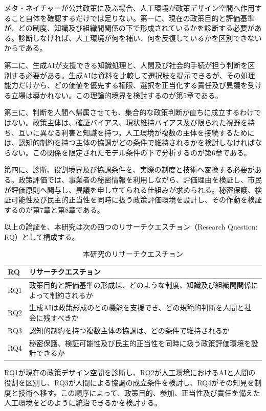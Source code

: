 メタ・ネイチャーが公共政策に及ぶ場合、人工環境が政策デザイン空間へ作用すること自体を確認するだけでは足りない。第一に、現在の政策目的と評価基準が、どの制度、知識及び組織間関係の下で形成されているかを診断する必要がある。診断しなければ、人工環境が何を補い、何を反復しているかを区別できないからである。

第二に、生成AIが支援できる知識処理と、人間及び社会的手続が担う判断を区別する必要がある。生成AIは資料を比較して選択肢を提示できるが、その処理能力だけから、どの価値を優先する権限、選択を正当化する責任及び異議を受ける立場は導かれない。この理論的境界を検討するのが第5章である。

第三に、判断を人間へ帰属させても、集合的な政策判断が直ちに成立するわけではない。政策主体は、確証バイアス、現状維持バイアス及び限られた視野を持ち、互いに異なる利害と知識を持つ。人工環境が複数の主体を接続するためには、認知的制約を持つ主体の協調がどの条件で維持されるかを検討しなければならない。この関係を限定されたモデル条件の下で分析するのが第6章である。

第四に、診断、役割境界及び協調条件を、実際の制度と技術へ変換する必要がある。政策評価では、事業者の秘密情報を利用しながら、評価理由を検証し、市民が評価原則へ関与し、異議を申し立てられる仕組みが求められる。秘密保護、検証可能性及び民主的正当性を同時に扱う政策評価環境を設計し、その作動を検証するのが第7章と第8章である。

以上の論証を、本研究は次の四つのリサーチクエスチョン（Research Question: RQ）として構成する。

\begin{table}[H]
  \centering
  \caption{本研究のリサーチクエスチョン}
  \label{tab:rq_general}
  \small
  \begin{tabularx}{\textwidth}{p{}X}
    \toprule
    RQ & リサーチクエスチョン \\
    \midrule
    RQ1 & 政策目的と評価基準の形成は、どのような制度、知識及び組織間関係によって制約されるか \\
    RQ2 & 生成AIは政策形成のどの機能を支援でき、どの規範的判断を人間と社会に残すべきか \\
    RQ3 & 認知的制約を持つ複数主体の協調は、どの条件で維持されるか \\
    RQ4 & 秘密保護、検証可能性及び民主的正当性を同時に扱う政策評価環境を設計できるか \\
    \bottomrule
  \end{tabularx}
\end{table}

RQ1が現在の政策デザイン空間を診断し、RQ2が人工環境におけるAIと人間の役割を区別し、RQ3が人間による協調の成立条件を検討し、RQ4がその知見を制度と技術へ移す。この順序によって、政策目的、参加、正当性及び責任を備えた人工環境をどのように統治できるかを検討する。

